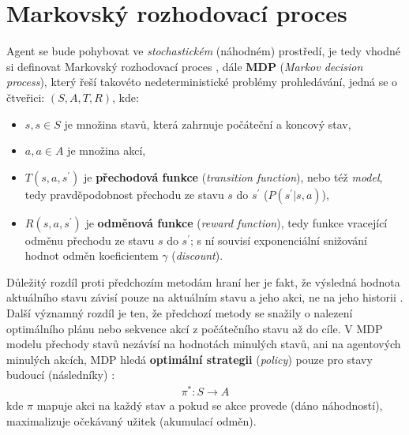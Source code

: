 \section{Markovský rozhodovací proces}
\label{sec:mdp}
Agent se bude pohybovat ve \textit{stochastickém} (náhodném) prostředí, je tedy vhodné si definovat Markovský rozhodovací proces \cite{RLAprox}, dále \textbf{MDP} (\textit{Markov decision process}), který řeší takovéto nedeterministické problémy prohledávání, jedná se o čtveřici:
$(S,A,T,R)$, kde:
\begin{itemize}
\item $s, s \in S$ je množina stavů, která zahrnuje počáteční a koncový stav,
\item $a, a \in A$ je množina akcí,
\item $T(s,a,s^\prime)$ je \textbf{přechodová funkce} (\textit{transition function}), nebo též \textit{model}, tedy pravděpodobnost přechodu ze stavu $s$ do $s^\prime$ ($P(s^\prime| s, a) $),
\item $R(s,a,s^\prime)$ je  \textbf{odměnová funkce} (\textit{reward function}), tedy funkce vracející odměnu přechodu ze stavu $s$ do $s^\prime$;  s ní souvisí exponenciální snižování hodnot odměn koeficientem $\gamma$ (\textit{discount}).
\end{itemize}
Důležitý rozdíl proti předchozím metodám hraní her je fakt, že výsledná hodnota aktuálního stavu závisí pouze na aktuálním stavu a jeho akci, ne na jeho historii \cite{reiftutorial}.
Další významný rozdíl je ten, že předchozí metody se snažily o nalezení optimálního plánu nebo sekvence akcí z počátečního stavu až do cíle. V MDP modelu přechody stavů nezávísí na hodnotách minulých stavů, ani na agentových minulých akcích, MDP hledá \textbf{optimální strategii} (\textit{policy}) pouze pro stavy budoucí (následníky) \cite{agents}:
\begin{align}
\pi^*: S \to A
\end{align}
kde $\pi$ mapuje akci na každý stav a pokud se akce provede (dáno náhodností), maximalizuje očekávaný užitek (akumulací odměn). \newline

